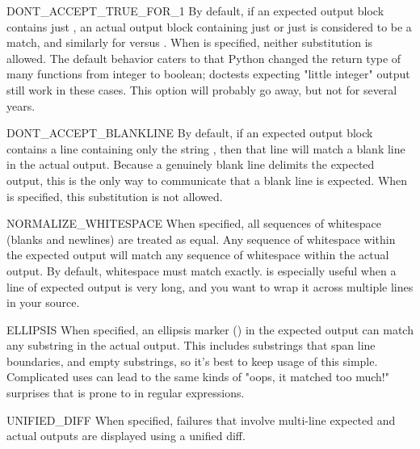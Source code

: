 \begin{datadesc}{DONT_ACCEPT_TRUE_FOR_1}
    By default, if an expected output block contains just ,
    an actual output block containing just  or just
     is considered to be a match, and similarly for 
    versus .  When  is
    specified, neither substitution is allowed.  The default behavior
    caters to that Python changed the return type of many functions
    from integer to boolean; doctests expecting "little integer"
    output still work in these cases.  This option will probably go
    away, but not for several years.
\end{datadesc}

\begin{datadesc}{DONT_ACCEPT_BLANKLINE}
    By default, if an expected output block contains a line
    containing only the string , then that line
    will match a blank line in the actual output.  Because a
    genuinely blank line delimits the expected output, this is
    the only way to communicate that a blank line is expected.  When
     is specified, this substitution
    is not allowed.
\end{datadesc}

\begin{datadesc}{NORMALIZE_WHITESPACE}
    When specified, all sequences of whitespace (blanks and newlines) are
    treated as equal.  Any sequence of whitespace within the expected
    output will match any sequence of whitespace within the actual output.
    By default, whitespace must match exactly.
     is especially useful when a line
    of expected output is very long, and you want to wrap it across
    multiple lines in your source.
\end{datadesc}

\begin{datadesc}{ELLIPSIS}
    When specified, an ellipsis marker () in the expected output
    can match any substring in the actual output.  This includes
    substrings that span line boundaries, and empty substrings, so it's
    best to keep usage of this simple.  Complicated uses can lead to the
    same kinds of "oops, it matched too much!" surprises that 
    is prone to in regular expressions.
\end{datadesc}

\begin{datadesc}{UNIFIED_DIFF}
    When specified, failures that involve multi-line expected and
    actual outputs are displayed using a unified diff.
\end{datadesc}

